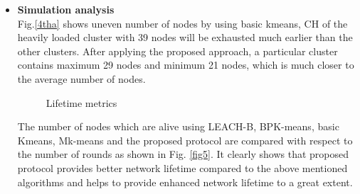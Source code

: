 \documentclass[11pt]{report}
\begin{document}
	\begin{itemize}
		\item \textbf{Simulation analysis}\\
		Fig.\ref {4tha} shows uneven number of nodes by using basic kmeans, CH of the heavily loaded cluster with 39 nodes will be exhausted much earlier than the other clusters. After applying the proposed approach, a particular cluster contains maximum 29 nodes and minimum 21 nodes, which is much closer to the average number of nodes. \\
		\begin{figure}[!h]
			\centering
			\caption{Lifetime metrics}
			\label{4th}
		\end{figure}
		The number of nodes which are alive using LEACH-B, BPK-means, basic Kmeans, Mk-means and the proposed protocol are compared with respect to the number of rounds as shown in Fig. \ref {fig5}. It clearly shows that proposed protocol provides better network lifetime compared to the above mentioned algorithms and helps to provide enhanced network lifetime to a great extent. \\

\end{itemize}
\end{document}
